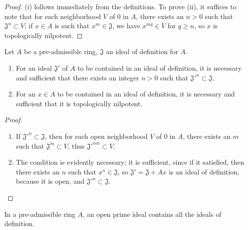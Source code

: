 \begin{proof}
\label{proof-0.7.1.3}
(i) follows immediately from the definitions. To prove (ii), it suffices to note that for
each neighborhood $V$ of $0$ in $A$, there exists an $n>0$ such that
$\mathfrak{J}^n\subset V$; if $x\in A$ is such that $x^m\in\mathfrak{J}$, we have
$x^{mq}\in V$ for $q\geqslant n$, so $x$ is topologically nilpotent.
\end{proof}

\begin{prop}[7.1.4]
\label{0.7.1.4}
Let $A$ be a pre-admissible ring, $\mathfrak{J}$ an ideal of definition for $A$.
\begin{enumerate}[label={\rm(\roman*)}]
  \item For an ideal $\mathfrak{J}'$ of $A$ to be contained in an ideal of
    definition, it is necessary and sufficient that there exists an integer
    $n>0$ such that ${\mathfrak{J}'}^n\subset\mathfrak{J}$.
  \item For an $x\in A$ to be contained in an ideal of definition, it is
    necessary and sufficient that it is topologically nilpotent.
\end{enumerate}
\end{prop}

\begin{proof}
\label{proof-0.7.1.4}
\medskip\noindent
\begin{enumerate}[label=(\roman*)]
  \item If ${\mathfrak{J}'}^n\subset\mathfrak{J}$, then for each open neighborhood
    $V$ of $0$ in $A$, there exists an $m$ such that $\mathfrak{J}^m\subset V$, thus
    ${\mathfrak{J}'}^{mn}\subset V$.
  \item The condition is evidently necessary; it is sufficient, since if it
    satisfied, then there exists an $n$ such that $x^n\in\mathfrak{J}$, so
    $\mathfrak{J}'=\mathfrak{J}+Ax$ is an ideal of definition, because it is
    open, and ${\mathfrak{J}'}^n\subset\mathfrak{J}$.
\end{enumerate}
\end{proof}

\begin{cor}[7.1.5]
\label{0.7.1.5}
In a pre-admissible ring $A$, an open prime ideal contains all the ideals of definition.
\end{cor}

